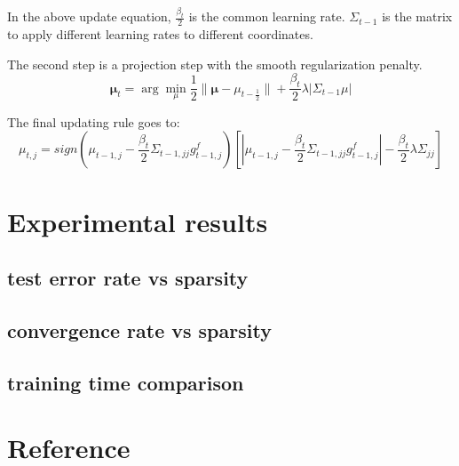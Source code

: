 \documentclass{article}
\begin{document}
In the above update equation, $\frac{\beta_t}{2}$ is the common learning rate.
$\Sigma_{t-1}$ is the matrix to apply different learning rates to different
coordinates.

The second step is a projection step with the smooth regularization penalty.
\begin{equation}
    \bm{\mu}_{t} = \arg\min_{\mu}{\frac{1}{2}\|\bm{\mu} - \mu_{t-\frac{1}{2}}\|
    + \frac{\beta_t}{2}\lambda|\Sigma_{t-1}\mu|}
    \label{equ:08}
\end{equation}


The final updating rule goes to:
\begin{equation}
    \mu_{t,j} = sign(\mu_{t-1,j} -
    \frac{\beta_t}{2}\Sigma_{t-1,jj}g_{t-1,j}^f)
    [|\mu_{t-1,j} - \frac{\beta_t}{2}\Sigma_{t-1,jj}g_{t-1,j}^f| -
    \frac{\beta_t}{2}\lambda\Sigma_{jj}]
    \label{equ:09}
\end{equation}

\section{Experimental results}
\subsection{test error rate vs sparsity}
\subsection{convergence rate vs sparsity}
\subsection{training time comparison}

\section{Reference}
\end{document}
